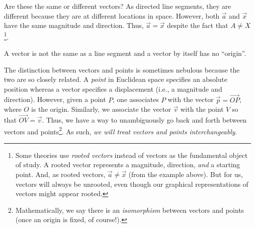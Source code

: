 \begin{center}
	\usetikzlibrary{patterns,decorations.pathreplacing}
\end{center}

Are these 
the same or different vectors?  As directed line segments,
they are different because they are at different locations in space.  
However, both $\vec a$ and $\vec x$ have the same
magnitude and direction.  Thus, $\vec a=\vec x$ despite the fact that $A\neq X$\footnote{
	Some theories use \emph{rooted vectors} instead of
	vectors as the fundamental object of study. A rooted vector
	represents a magnitude, direction, \emph{and} a starting point. And, 
	as rooted vectors, $\vec a\neq \vec x$ (from the example above).
	But for us, vectors will always be unrooted, even though our graphical
	representations of vectors might appear rooted.
}.
\begin{emphbox}[Takeaway]
	A vector is not the same as a line segment and a vector by itself
	has no ``origin''.
\end{emphbox}


The distinction between vectors and points is sometimes nebulous because
the two are so closely related.  A \emph{point}
in Euclidean space specifies an absolute position whereas a vector
specifies a displacement (i.e., a magnitude and direction).  However, given a point $P$,
one associates $P$ with the vector $\vec p=\overrightarrow{OP}$, where $O$
is the origin.  Similarly, we associate the vector $\vec v$ with
the point $V$ so that $\overrightarrow{OV}=\vec v$.
Thus, we have a way to unambiguously go back and forth between vectors and
points\footnote{ Mathematically, we say there is an \emph{isomorphism} between
vectors and points (once an origin is fixed, of course!).}.  As such, \emph{we will treat vectors and points
interchangeably}.

